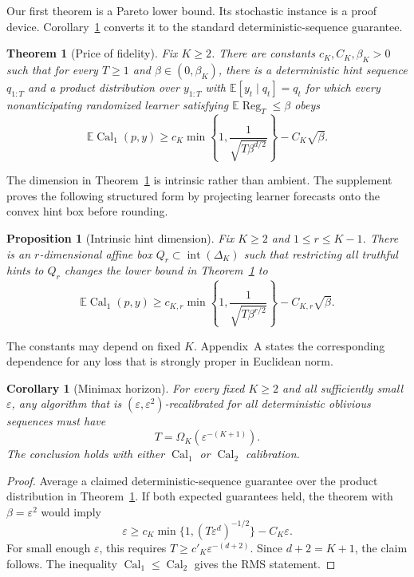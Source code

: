 \documentclass[twoside]{article}
\newtheorem{theorem}{Theorem}
\newtheorem{corollary}{Corollary}
\newtheorem{proposition}{Proposition}
\newcommand{\E}{\mathbb E}
\newcommand{\calone}{\operatorname{Cal}_1}
\newcommand{\caltwo}{\operatorname{Cal}_2}
\newcommand{\Reg}{\operatorname{Reg}}
\newcommand{\simplex}{\Delta_K}
\newcommand{\1}{\mathbf 1}
\begin{document}
Our first theorem is a Pareto lower bound. Its stochastic instance is a proof device. Corollary~\ref{cor:deterministic} converts it to the standard deterministic-sequence guarantee.

\begin{theorem}[Price of fidelity]\label{thm:main}
Fix $K\geq2$. There are constants $c_K,C_K,\beta_K>0$ such that for every $T\geq1$ and $\beta\in(0,\beta_K)$, there is a deterministic hint sequence $q_{1:T}$ and a product distribution over $y_{1:T}$ with $\E[y_t\mid q_t]=q_t$ for which every nonanticipating randomized learner satisfying $\E\Reg_T\leq\beta$ obeys \[ \E\calone(p,y) \geq c_K\min\!\left\{1, \frac{1}{\sqrt{T\beta^{d/2}}}\right\} -C_K\sqrt\beta. \]
\end{theorem}

The dimension in Theorem~\ref{thm:main} is intrinsic rather than ambient. The supplement proves the following structured form by projecting learner forecasts onto the convex hint box before rounding.

\begin{proposition}[Intrinsic hint dimension]\label{prop:intrinsic}
Fix $K\geq2$ and $1\leq r\leq K-1$. There is an $r$-dimensional affine box $Q_r\subset\operatorname{int}(\simplex)$ such that restricting all truthful hints to $Q_r$ changes the lower bound in Theorem~\ref{thm:main} to \[ \E\calone(p,y) \geq c_{K,r}\min\left\{1, \frac1{\sqrt{T\beta^{r/2}}}\right\}-C_{K,r}\sqrt\beta. \]
\end{proposition}

The constants may depend on fixed $K$. Appendix~A states the corresponding dependence for any loss that is strongly proper in Euclidean norm.

\begin{corollary}[Minimax horizon]\label{cor:deterministic}
For every fixed $K\geq2$ and all sufficiently small $\varepsilon$, any algorithm that is $(\varepsilon,\varepsilon^2)$-recalibrated for all deterministic oblivious sequences must have \[ T=\Omega_K(\varepsilon^{-(K+1)}). \] The conclusion holds with either $\calone$ or $\caltwo$ calibration.
\end{corollary}

\begin{proof}
Average a claimed deterministic-sequence guarantee over the product distribution in Theorem~\ref{thm:main}. If both expected guarantees held, the theorem with $\beta=\varepsilon^2$ would imply \[ \varepsilon\geq c_K\min\{1,(T\varepsilon^d)^{-1/2}\}-C_K\varepsilon. \] For small enough $\varepsilon$, this requires $T\geq c'_K\varepsilon^{-(d+2)}$. Since $d+2=K+1$, the claim follows. The inequality $\calone\leq\caltwo$ gives the RMS statement.
\end{proof}
\end{document}
